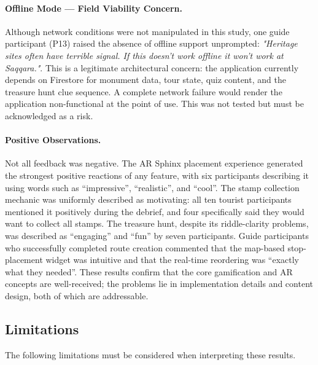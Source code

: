 \paragraph{Offline Mode — Field Viability Concern.}
Although network conditions were not manipulated in this study, one guide participant
(P13) raised the absence of offline support unprompted: \textit{"Heritage sites often
have terrible signal. If this doesn't work offline it won't work at Saqqara."}. This is
a legitimate architectural concern: the application currently depends on Firestore for
monument data, tour state, quiz content, and the treasure hunt clue sequence. A
complete network failure would render the application non-functional at the point of
use. This was not tested but must be acknowledged as a risk.

\paragraph{Positive Observations.}
Not all feedback was negative. The AR Sphinx placement experience generated the
strongest positive reactions of any feature, with six participants describing it using
words such as ``impressive'', ``realistic'', and ``cool''. The stamp collection
mechanic was uniformly described as motivating: all ten tourist participants mentioned
it positively during the debrief, and four specifically said they would want to collect
all stamps. The treasure hunt, despite its riddle-clarity problems, was described as
``engaging'' and ``fun'' by seven participants. Guide participants who successfully
completed route creation commented that the map-based stop-placement widget was
intuitive and that the real-time reordering was ``exactly what they needed''. These
results confirm that the core gamification and AR concepts are well-received; the
problems lie in implementation details and content design, both of which are addressable.

\subsection{Limitations}
\label{sec:limitations}

The following limitations must be considered when interpreting these results.

